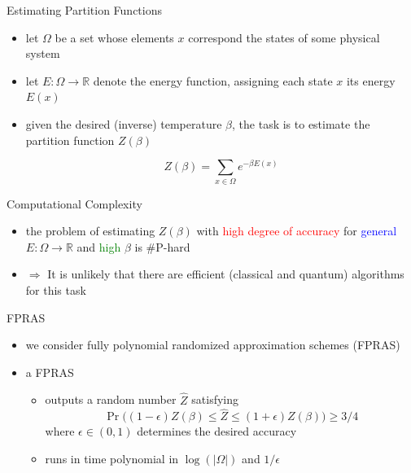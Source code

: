 \documentclass[slideColor]{prosper}
\renewcommand{\>}{\rangle}
\newcommand{\<}{\langle}
\begin{document}
\begin{slide}{Estimating Partition Functions}
\begin{itemize}
\item let $\Omega$ be a set whose elements $x$ correspond the states of some physical system

\bigskip
\item let $E : \Omega\rightarrow \mathbb{R}$ denote the energy function, assigning each state $x$ its energy $E(x)$

\bigskip
\item given the desired (inverse) temperature $\beta$, the task is to estimate the partition function $Z(\beta)$

\[
Z(\beta) = \sum_{x\in\Omega} e^{-\beta E(x)}
\]
\end{itemize}

\end{slide}


\begin{slide}{Computational Complexity}
\begin{itemize}

\bigskip
\item the problem of estimating $Z(\beta)$ with \textcolor{red}{high degree of accuracy} for \textcolor{blue}{general} $E : \Omega\rightarrow \mathbb{R}$ and \textcolor{green}{high} $\beta$ is \#P-hard

\bigskip
\item $\Longrightarrow$ It is unlikely that there are efficient (classical and quantum) algorithms for this task 
\end{itemize}

\end{slide}



\begin{slide}{FPRAS}
\begin{itemize}
\item we consider fully polynomial randomized approximation schemes (FPRAS)

\medskip
\item a FPRAS

\begin{itemize}
\item outputs a random number $\hat{Z}$ satisfying
\[
\Pr\Big( (1-\epsilon)Z(\beta) \le \hat{Z} \le (1+\epsilon) Z(\beta) \Big) \ge 3/4
\]
where $\epsilon\in (0,1)$ determines the desired accuracy

\medskip
\item runs in time polynomial in $\log(|\Omega|)$ and $1/\epsilon$
\end{itemize}
\end{itemize}
\end{slide}
\end{document}
